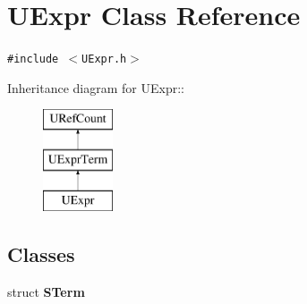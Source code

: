 \hypertarget{class_u_expr}{
\section{UExpr Class Reference}
\label{class_u_expr}
}
{\tt \#include $<$UExpr.h$>$}

Inheritance diagram for UExpr::\begin{figure}[H]
\begin{center}
\leavevmode
\includegraphics[height=3cm]{class_u_expr}
\end{center}
\end{figure}
\subsection*{Classes}
\begin{CompactItemize}
\item 
struct \textbf{STerm}
\end{CompactItemize}
